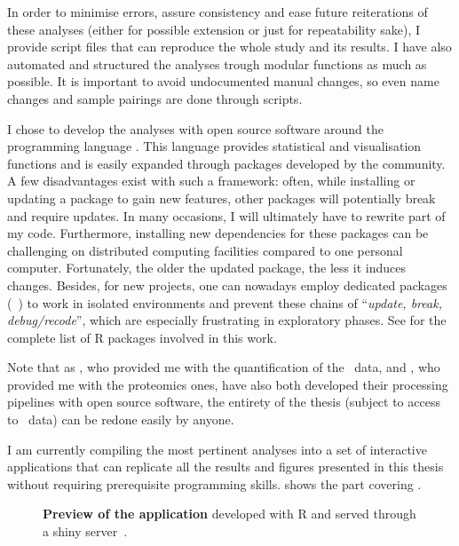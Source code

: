 In order to minimise errors,
assure consistency and ease future reiterations of these analyses
(either for possible extension or just for repeatability sake),
I provide script files that can reproduce the whole study and its results.
I have also automated and structured the analyses trough modular functions
as much as possible.
It is important to avoid undocumented manual changes,
so even name changes and sample pairings are done through scripts.

I chose to develop the analyses with open source software
around the programming language .
This language provides statistical and visualisation functions
and is easily expanded through packages developed by the community.
A few disadvantages exist with such a framework:
often, while installing or updating a package to gain new features,
other packages will potentially break and require updates.
In many occasions, I will ultimately have to rewrite part of my code.
Furthermore, installing new dependencies for these packages can be challenging
on distributed computing facilities compared to one personal computer.
Fortunately, the older the updated package, the less it induces changes.
Besides, for new projects, one can nowadays employ dedicated packages
(\eg\ )
to work in isolated environments and
prevent these chains of \enquote{\emph{update, break, debug/recode}},
which are especially frustrating in exploratory phases.
See  for the complete list of \textsf{R} packages
involved in this work.

Note that as \nuno, who provided me with the quantification of the \gtex\ data,
and \james, who provided me with the proteomics ones,
have also both developed their processing pipelines with open source software,
the entirety of the thesis (subject to access to \gtex\ data)
can be redone easily by anyone.

I am currently compiling the most pertinent analyses
into a set of interactive applications
that can replicate all the results and figures presented in this thesis
without requiring prerequisite programming skills.
 shows the part covering .

\begin{figure}[!ht]
    \centering
    \vspace{-2mm}
    \caption[Application preview]{\label{fig:demoApp}\textbf{Preview of the
    application} developed with \textsf{R}
    and served through a shiny server~.}
\end{figure}

